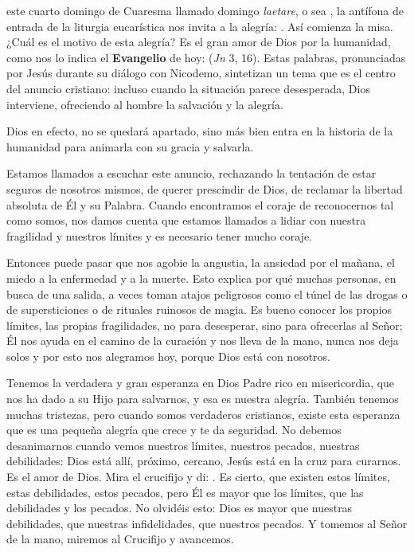 \begin{body}
 este cuarto domingo de Cuaresma llamado domingo \textit{laetare}, o sea , la antífona de entrada de la liturgia eucarística nos invita a la alegría: . Así comienza la misa. ¿Cuál es el motivo de esta alegría? Es el gran amor de Dios por la humanidad, como nos lo indica el \textbf{Evangelio} de hoy:  (\textit{Jn} 3, 16). Estas palabras, pronunciadas por Jesús durante su diálogo con Nicodemo, sintetizan un tema que es el centro del anuncio cristiano: incluso cuando la situación parece desesperada, Dios interviene, ofreciendo al hombre la salvación y la alegría.

Dios en efecto, no se quedará apartado, sino más bien entra en la historia de la humanidad para animarla con su gracia y salvarla.

Estamos llamados a escuchar este anuncio, rechazando la tentación de estar seguros de nosotros mismos, de querer prescindir de Dios, de reclamar la libertad absoluta de Él y su Palabra. Cuando encontramos el coraje de reconocernos tal como somos, nos damos cuenta que estamos llamados a lidiar con nuestra fragilidad y nuestros límites y es necesario tener mucho coraje.

Entonces puede pasar que nos agobie la angustia, la ansiedad por el mañana, el miedo a la enfermedad y a la muerte. Esto explica por qué muchas personas, en busca de una salida, a veces toman atajos peligrosos como el túnel de las drogas o de supersticiones o de rituales ruinosos de magia. Es bueno conocer los propios límites, las propias fragilidades, no para desesperar, sino para ofrecerlas al Señor; Él nos ayuda en el camino de la curación y nos lleva de la mano, nunca nos deja solos y por esto nos alegramos hoy, porque Dios está con nosotros.

Tenemos la verdadera y gran esperanza en Dios Padre rico en misericordia, que nos ha dado a su Hijo para salvarnos, y esa es nuestra alegría. También tenemos muchas tristezas, pero cuando somos verdaderos cristianos, existe esta esperanza que es una pequeña alegría que crece y te da seguridad. No debemos desanimarnos cuando vemos nuestros límites, nuestros pecados, nuestras debilidades: Dios está allí, próximo, cercano, Jesús está en la cruz para curarnos. Es el amor de Dios. Mira el crucifijo y di: . Es cierto, que existen estos límites, estas debilidades, estos pecados, pero Él es mayor que los límites, que las debilidades y los pecados. No olvidéis esto: Dios es mayor que nuestras debilidades, que nuestras infidelidades, que nuestros pecados. Y tomemos al Señor de la mano, miremos al Crucifijo y avancemos.


\end{body}
